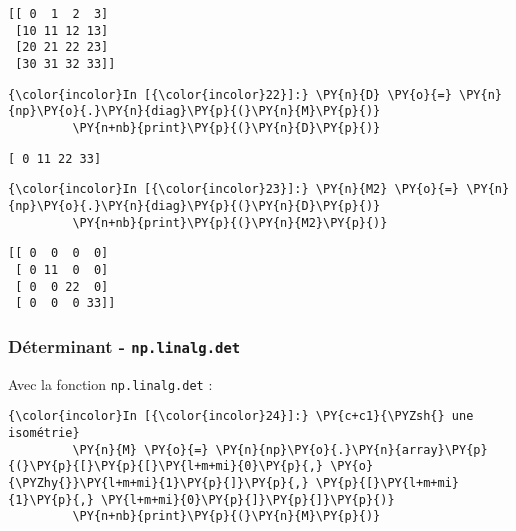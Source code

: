     \begin{Verbatim}[commandchars=\\\{\},frame=single,framerule=0.3mm,rulecolor=\color{cellframecolor}]
[[ 0  1  2  3]
 [10 11 12 13]
 [20 21 22 23]
 [30 31 32 33]]
\end{Verbatim}

    \begin{Verbatim}[commandchars=\\\{\},frame=single,framerule=0.3mm,rulecolor=\color{cellframecolor}]
{\color{incolor}In [{\color{incolor}22}]:} \PY{n}{D} \PY{o}{=} \PY{n}{np}\PY{o}{.}\PY{n}{diag}\PY{p}{(}\PY{n}{M}\PY{p}{)}
         \PY{n+nb}{print}\PY{p}{(}\PY{n}{D}\PY{p}{)}
\end{Verbatim}


    \begin{Verbatim}[commandchars=\\\{\},frame=single,framerule=0.3mm,rulecolor=\color{cellframecolor}]
[ 0 11 22 33]
\end{Verbatim}

    \begin{Verbatim}[commandchars=\\\{\},frame=single,framerule=0.3mm,rulecolor=\color{cellframecolor}]
{\color{incolor}In [{\color{incolor}23}]:} \PY{n}{M2} \PY{o}{=} \PY{n}{np}\PY{o}{.}\PY{n}{diag}\PY{p}{(}\PY{n}{D}\PY{p}{)}
         \PY{n+nb}{print}\PY{p}{(}\PY{n}{M2}\PY{p}{)}
\end{Verbatim}


    \begin{Verbatim}[commandchars=\\\{\},frame=single,framerule=0.3mm,rulecolor=\color{cellframecolor}]
[[ 0  0  0  0]
 [ 0 11  0  0]
 [ 0  0 22  0]
 [ 0  0  0 33]]
\end{Verbatim}

    \hypertarget{duxe9terminant---np.linalg.det}{%
\subsubsection{\texorpdfstring{Déterminant -
\texttt{np.linalg.det}}{Déterminant - np.linalg.det}}\label{duxe9terminant---np.linalg.det}}

    Avec la fonction \texttt{np.linalg.det} :

    \begin{Verbatim}[commandchars=\\\{\},frame=single,framerule=0.3mm,rulecolor=\color{cellframecolor}]
{\color{incolor}In [{\color{incolor}24}]:} \PY{c+c1}{\PYZsh{} une isométrie}
         \PY{n}{M} \PY{o}{=} \PY{n}{np}\PY{o}{.}\PY{n}{array}\PY{p}{(}\PY{p}{[}\PY{p}{[}\PY{l+m+mi}{0}\PY{p}{,} \PY{o}{\PYZhy{}}\PY{l+m+mi}{1}\PY{p}{]}\PY{p}{,} \PY{p}{[}\PY{l+m+mi}{1}\PY{p}{,} \PY{l+m+mi}{0}\PY{p}{]}\PY{p}{]}\PY{p}{)}
         \PY{n+nb}{print}\PY{p}{(}\PY{n}{M}\PY{p}{)}
\end{Verbatim}


